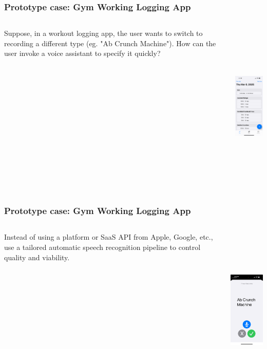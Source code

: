 \documentclass{beamer}
\begin{document}
\begin{frame}
\frametitle{Prototype case: Gym Working Logging App}
\begin{columns}
\begin{column}{0.5\textwidth}
    Suppose, in a workout logging app, the user wants to switch to recording a different type (eg. "Ab Crunch Machine"). How can the user invoke a voice assistant to specify it quickly?
    \vspace{2cm}
\end{column}
\begin{column}{0.5\textwidth}
    \centering
    \includegraphics[height=8cm]{images/sc.png}
\end{column}
\end{columns}
\end{frame}

\begin{frame}
\frametitle{Prototype case: Gym Working Logging App}
\begin{columns}
\begin{column}{0.5\textwidth}
    Instead of using a platform or SaaS API from Apple, Google, etc., use a tailored automatic speech recognition pipeline to control quality and viability.
    \vspace{2cm}
\end{column}
\begin{column}{0.5\textwidth}
    \centering
    \includegraphics[height=8cm]{images/scasr.png}
\end{column}
\end{columns}
\end{frame}
\end{document}
